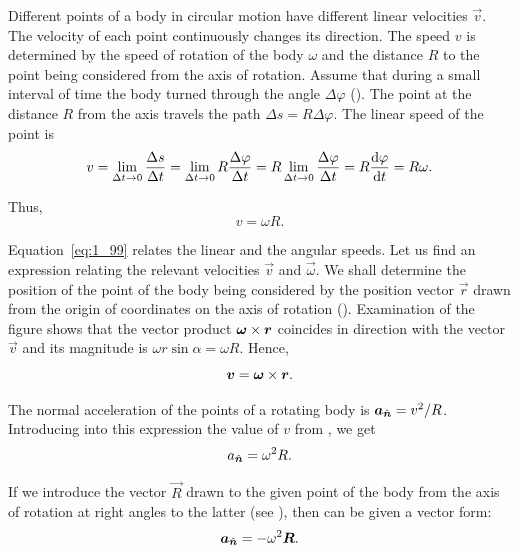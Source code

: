 Different points of a body in circular motion have different linear velocities $\vec{v}$. The velocity of each point continuously changes its direction. The speed $v$ is determined by the speed of rotation of the body $\omega$ and the distance $R$ to the point being considered from the axis of rotation. Assume that during a small interval of time the body turned through the angle $\Delta\varphi$ (). The point at the distance $R$ from the axis travels the path $\Delta s=R\Delta\varphi$. The linear speed of the point is
\begin{equation*}
v = \lim_{\Delta t\to 0} \frac{\Delta s}{\Delta t} = \lim_{\Delta t\to 0} R\frac{\Delta\varphi}{\Delta t} = R \lim_{\Delta t\to 0} \frac{\Delta\varphi}{\Delta t} = R\frac{\mathrm{d}\varphi}{\mathrm{d} t} = R\omega.
\end{equation*}

\noindent
Thus,
\begin{equation}\label{eq:1_99}
v = \omega R.
\end{equation}

Equation~\eqref{eq:1_99} relates the linear and the angular speeds. Let us find an expression relating the relevant velocities $\vec{v}$ and $\vec{\omega}$. We shall determine the position of the point of the body being considered by the position vector $\vec{r}$ drawn from the origin of coordinates on the axis of rotation (). Examination of the figure shows that the vector product $\boldsymbol{\omega}\times\boldsymbol{r}$ coincides in direction with the vector $\vec{v}$ and its magnitude is $\omega r\sin\alpha=\omega R$. Hence,
\begin{equation}\label{eq:1_100}
\boldsymbol{v} = \boldsymbol{\omega}\times\boldsymbol{r}.
\end{equation}


The normal acceleration of the points of a rotating body is $\boldsymbol{a}_{\hat{\boldsymbol{n}}}=v^2/R$. Introducing into this expression the value of $v$ from , we get
\begin{equation}\label{eq:1_101}
a_{\hat{\boldsymbol{n}}} = \omega^2 R.
\end{equation}

\noindent
If we introduce the vector $\vec{R}$ drawn to the given point of the body from the axis of rotation at right angles to the latter (see ), then  can be given a vector form:
\begin{equation}\label{eq:1_102}
\boldsymbol{a}_{\hat{\boldsymbol{n}}} = -\omega^2 \boldsymbol{R}.
\end{equation}


